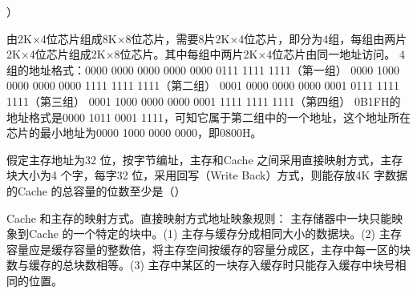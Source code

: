）
\par{}
\begin{solution}由2K×4位芯片组成8K×8位芯片，需要8片2K×4位芯片，即分为4组，每组由两片2K×4位芯片组成2K×8位芯片。其中每组中两片2K×4位芯片由同一地址访问。
4组的地址格式：0000 0000 0000 0000 0000 0111 1111 1111（第一组） 0000
1000 0000 0000 0000 1111 1111 1111（第二组） 0001 0000 0000 0000 0001
0111 1111 1111（第三组） 0001 1000 0000 0000 0001 1111 1111
1111（第四组） 0B1FH的地址格式是0000 1011 0001
1111，可知它属于第二组中的一个地址，这个地址所在芯片的最小地址为0000
1000 0000 0000，即0800H。
\end{solution}
\question 假定主存地址为32 位，按字节编址，主存和Cache
之间采用直接映射方式，主存块大小为4 个字，每字32 位，采用回写（Write
Back）方式，则能存放4K 字数据的Cache 的总容量的位数至少是（）
\par{}
\begin{solution}Cache 和主存的映射方式。直接映射方式地址映象规则：
主存储器中一块只能映象到Cache 的一个特定的块中。(1)
主存与缓存分成相同大小的数据块。(2)
主存容量应是缓存容量的整数倍，将主存空间按缓存的容量分成区，主存中每一区的块数与缓存的总块数相等。(3)
主存中某区的一块存入缓存时只能存入缓存中块号相同的位置。
\end{solution}
